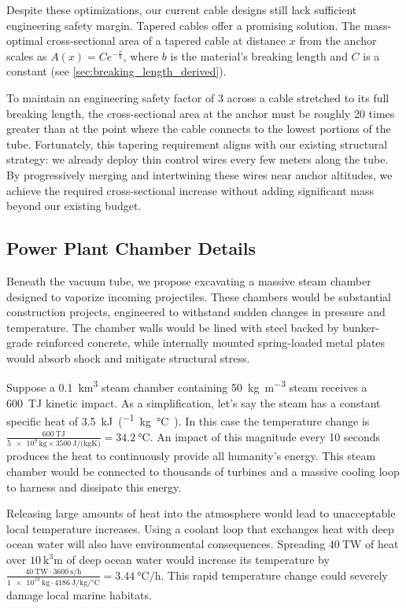 \documentclass{article}
\begin{document}
Despite these optimizations, our current cable designs still lack sufficient engineering safety margin. Tapered cables offer a promising solution. The mass-optimal cross-sectional area of a tapered cable at distance $x$ from the anchor scales as $A(x) = C e^{-\frac{x}{b}}$, where $b$ is the material’s breaking length and $C$ is a constant (see \autoref{sec:breaking_length_derived}). 

To maintain an engineering safety factor of 3 across a cable stretched to its full breaking length, the cross-sectional area at the anchor must be roughly 20 times greater than at the point where the cable connects to the lowest portions of the tube. Fortunately, this tapering requirement aligns with our existing structural strategy: we already deploy thin control wires every few meters along the tube. By progressively merging and intertwining these wires near anchor altitudes, we achieve the required cross-sectional increase without adding significant mass beyond our existing budget.



\subsection{Power Plant Chamber Details}
Beneath the vacuum tube, we propose excavating a massive steam chamber designed to vaporize incoming projectiles. These chambers would be substantial construction projects, engineered to withstand sudden changes in pressure and temperature.  The chamber walls would be lined  with steel backed by bunker-grade reinforced concrete, while internally mounted spring-loaded metal plates would absorb shock and mitigate structural stress.  

Suppose a \SI{0.1}{\cubic\kilo\meter} steam chamber containing \SI{50}{\kilo\gram\per\cubic\meter} steam receives a \SI{600}{\tera\joule} kinetic impact.   As a simplification, let's say the steam has a constant specific heat of \SI{3.5}{\kilo\joule\per(\kilo\gram\celsius)}.  In this case the temperature change is 
$\frac{\SI{600}{\tera\joule}}{\SI{5e9}{\kilo\gram}\times\SI{3500}{\joule\per(\kilo\gram\kelvin)}} = \SI{34.2}{\celsius}$.  An impact of this magnitude every 10 seconds produces the heat to continuously provide all humanity's energy.  This steam chamber would be connected to thousands of turbines and a massive cooling loop to harness and dissipate this energy.  

Releasing large amounts of heat into the atmosphere would lead to unacceptable local temperature increases. Using a coolant loop that exchanges heat with deep ocean water will also have environmental consequences. Spreading $\SI{40}{\tera\watt}$ of heat over $\SI{10}{\cubic\kilo\meter}$ of deep ocean water would increase its temperature by $\frac{\SI{40}{\tera\watt}\cdot\SI{3600}{\second\per\hour}}{\SI{1e13}{\kilo\gram}\cdot\SI{4186}{\joule\per\kilo\gram\per\celsius}} = \SI{3.44}{\celsius\per\hour}$.  This rapid temperature change could severely damage local marine habitats.
\end{document}
